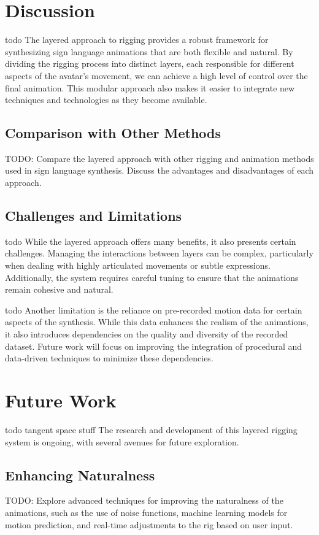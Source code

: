 \documentclass[../../main.tex]{subfiles}
\begin{document}
\section{Discussion}
todo The layered approach to rigging provides a robust framework for synthesizing sign language animations that are both flexible and natural. By dividing the rigging process into distinct layers, each responsible for different aspects of the avatar's movement, we can achieve a high level of control over the final animation. This modular approach also makes it easier to integrate new techniques and technologies as they become available.

\subsection{Comparison with Other Methods}
TODO: Compare the layered approach with other rigging and animation methods used in sign language synthesis. Discuss the advantages and disadvantages of each approach.

\subsection{Challenges and Limitations}
todo While the layered approach offers many benefits, it also presents certain challenges. Managing the interactions between layers can be complex, particularly when dealing with highly articulated movements or subtle expressions. Additionally, the system requires careful tuning to ensure that the animations remain cohesive and natural.

todo Another limitation is the reliance on pre-recorded motion data for certain aspects of the synthesis. While this data enhances the realism of the animations, it also introduces dependencies on the quality and diversity of the recorded dataset. Future work will focus on improving the integration of procedural and data-driven techniques to minimize these dependencies.

\section{Future Work}
todo tangent space stuff The research and development of this layered rigging system is ongoing, with several avenues for future exploration.

\subsection{Enhancing Naturalness}
TODO: Explore advanced techniques for improving the naturalness of the animations, such as the use of noise functions, machine learning models for motion prediction, and real-time adjustments to the rig based on user input.
\end{document}
